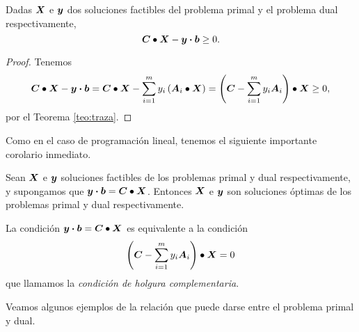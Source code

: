 \begin{theorem}
  Dadas $\bm{X}$ e $\bm{y}$ dos soluciones factibles del problema primal y el problema dual respectivamente, 
  $$\bm{C} \bullet \bm{X} - \bm{y} \boldsymbol{\cdot} \bm{b} \ge 0.$$
\end{theorem}

\begin{proof}
Tenemos
  $$\bm{C} \bullet \bm{X} - \bm{y} \boldsymbol{\cdot} \bm{b} = \bm{C} \bullet \bm{X} -  \sum_{i=1}^m y_i \left(\bm{A}_i \bullet \bm{X}\right) = 
   \left(\bm{C} - \sum_{i=1}^m y_i \bm{A}_i\right) \bullet \bm{X} \ge 0,
   $$
  por el Teorema \ref{teo:traza}.
\end{proof}

Como en el caso de programación lineal, tenemos el siguiente importante corolario inmediato.

\begin{coro}
Sean $\bm{X}$ e $\bm{y}$ soluciones factibles de los problemas primal y dual respectivamente, y supongamos que $\bm{y} \boldsymbol{\cdot} \bm{b} = \bm{C} \bullet \bm{X}$. Entonces $\bm{X}$ e $\bm{y}$ son soluciones óptimas de los problemas primal y dual respectivamente.
\end{coro}

La condición $\bm{y} \boldsymbol{\cdot} \bm{b} = \bm{C} \bullet \bm{X}$ es equivalente a la condición
$$
\left(\bm{C} - \sum_{i=1}^m y_i \bm{A}_i\right) \bullet \bm{X} = 0
$$
que llamamos la \emph{condición de holgura complementaria}.

Veamos algunos ejemplos de la relación que puede darse entre el problema primal y dual.


